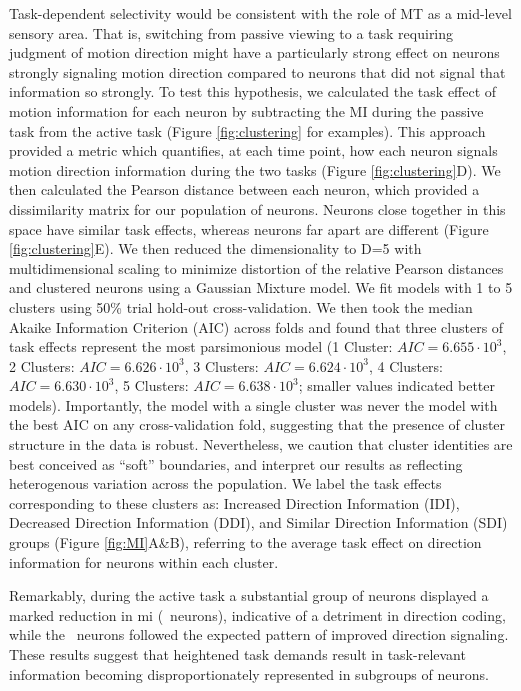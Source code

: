 Task-dependent selectivity would be consistent with the role of MT as a mid-level sensory area. That is, switching from passive viewing to a task requiring judgment of motion direction might have a particularly strong effect on neurons strongly signaling motion direction compared to neurons that did not signal that information so strongly. To test this hypothesis, we calculated the task effect of motion information for each neuron by subtracting the MI during the passive task from the active task (Figure \ref{fig:clustering} for examples).
This approach provided a metric which quantifies, at each time point, how each neuron signals motion direction information during the two tasks (Figure \ref{fig:clustering}D). We then calculated the Pearson distance between each neuron, which provided a dissimilarity matrix for our population of neurons. 
Neurons close together in this space have similar task effects, whereas neurons far apart are different (Figure \ref{fig:clustering}E).  We then reduced the dimensionality to D=5 with multidimensional scaling to minimize distortion of the relative Pearson distances and clustered neurons using a Gaussian Mixture model. We fit models with 1 to 5 clusters using 50\% trial hold-out cross-validation. We then took the median Akaike Information Criterion (AIC) across folds and found that three clusters of task effects represent the most parsimonious model (1 Cluster: $AIC=6.655 \cdot 10^{3}$, 2 Clusters: $AIC=6.626 \cdot 10^{3}$, 3 Clusters: $AIC=6.624 \cdot 10^{3}$, 4 Clusters: $AIC=6.630 \cdot 10^{3}$, 5 Clusters: $AIC=6.638 \cdot 10^{3}$; smaller values indicated better models). Importantly, the model with a single cluster was never the model with the best AIC on any cross-validation fold, suggesting that the presence of cluster structure in the data is robust. Nevertheless, we caution that cluster identities are best conceived as ``soft'' boundaries, and interpret our results as reflecting heterogenous variation across the population.\label{rev:het2} We label the task effects corresponding to these clusters as: Increased Direction Information (IDI), Decreased Direction Information (DDI), and Similar Direction Information (SDI) groups (Figure \ref{fig:MI}A\&B), referring to the average task effect on direction information for neurons within each cluster.

Remarkably, during the active task a substantial group of neurons displayed a marked reduction in \gls{mi} (\suppressed\ neurons), indicative of a detriment in direction coding, while the \enhanced\ neurons followed the expected pattern of improved direction signaling. These results suggest that heightened task demands result in task-relevant information becoming disproportionately represented in subgroups of neurons.

